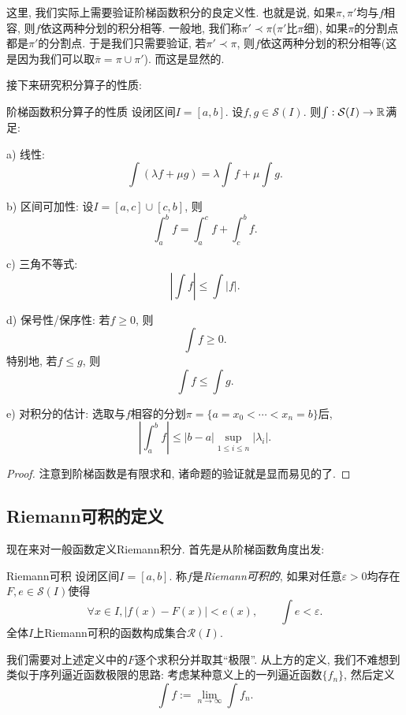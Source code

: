 这里, 我们实际上需要验证阶梯函数积分的良定义性. 也就是说, 如果$\pi, \pi '$均与$f$相容, 则$f$依这两种分划的积分相等. 一般地, 我们称$\pi ' \prec \pi$($\pi '$比$\pi$细), 如果$\pi$的分割点都是$\pi '$的分割点. 于是我们只需要验证, 若$\pi ' \prec \pi$, 则$f$依这两种分划的积分相等(这是因为我们可以取$\overline{\pi} = \pi \cup \pi '$). 而这是显然的. 

接下来研究积分算子的性质: 

\begin{proposition}{阶梯函数积分算子的性质}
	设闭区间$I=[a,b]$. 设$f,g \in \mathcal{S}(I)$. 则$\int : \mathcal{S}(I) \to \mathbb{R}$满足: 
	
	a) 线性: $$\int (\lambda f+ \mu g) = \lambda \int f + \mu \int g.$$
	
	b) 区间可加性: 设$I=[a,c] \cup [c,b]$, 则$$\int_a^b f = \int_a^c f + \int_c^b f. $$
	
	c) 三角不等式: $$\left| \int f \right| \leq \int |f|. $$
	
	d) 保号性/保序性: 若$f \geq 0$, 则$$\int f \geq 0. $$
	\qquad 特别地, 若$f \leq g$, 则$$ \int f \leq  \int g.$$
	
	e) 对积分的估计: 选取与$f$相容的分划$\pi= \{ a=x_0<\cdots <x_n=b \}$后, $$\left| \int_a^b f \right| \leq |b-a| \sup_{1 \leq i \leq n} |\lambda _i|. $$
\end{proposition}
\begin{proof}
	注意到阶梯函数是有限求和, 诸命题的验证就是显而易见的了. 
\end{proof}

\subsection{Riemann可积的定义}

现在来对一般函数定义Riemann积分. 首先是从阶梯函数角度出发: 

\begin{definition}{Riemann可积}
	设闭区间$I=[a,b]$. 称$f$是\textit{Riemann可积的}, 如果对任意$\varepsilon >0$均存在$F,e \in \mathcal{S}(I)$使得$$\forall x \in I,|f(x)-F(x)|<e(x),\qquad \int e < \varepsilon .$$
	全体$I$上Riemann可积的函数构成集合$\mathcal{R}(I)$. 
\end{definition}


我们需要对上述定义中的$F$逐个求积分并取其“极限”. 从上方的定义, 我们不难想到类似于序列逼近函数极限的思路: 考虑某种意义上的一列逼近函数$\{ f_n \}$, 然后定义$$\int f := \lim_{n\to \infty} \int f_n.$$

